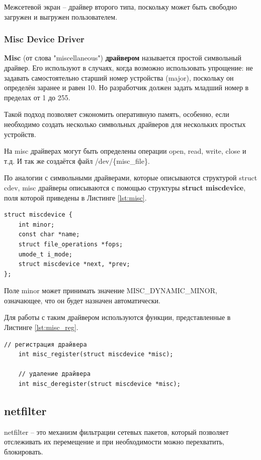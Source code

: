Межсетевой экран -- драйвер второго типа, поскольку может быть свободно загружен и выгружен пользователем. \newline

\subsubsection{Misc Device Driver}
\textbf{Misc} (от слова "miscellaneous") \textbf{драйвером} называется простой символьный драйвер. Его используют в случаях, когда возможно использовать упрощение: не задавать самостоятельно старший номер устройства (major), поскольку он определён заранее и равен 10. Но разработчик должен задать младший номер в пределах от 1 до 255. \cite{2nd,misc}

Такой подход позволяет сэкономить оперативную память, особенно, если необходимо создать несколько символьных драйверов для нескольких простых устройств.

На misc драйверах могут быть определены операции open, read, write, close и т.д. И так же создаётся файл /dev/\{misc\_file\}.

По аналогии с символьными драйверами, которые описываются структурой struct cdev, misc драйверы описываются с помощью структуры \textbf{struct miscdevice}, поля которой приведены в Листинге \ref{lst:misc}.
\begin{lstlisting}[caption = {struct miscdevice}, label=lst:misc]
struct miscdevice {
	int minor;
	const char *name;
	struct file_operations *fops;
	umode_t i_mode;
	struct miscdevice *next, *prev;
};
\end{lstlisting}

Поле minor может принимать значение MISC\_DYNAMIC\_MINOR, означающее, что он будет назначен автоматически. \cite{3d}

Для работы с таким драйвером используются функции, представленные в Листинге \ref{lst:misc_reg}.
\begin{lstlisting}[caption = {Функции для регистрации и удаления misc драйвера}, label=lst:misc_reg]
	// регистрация драйвера
	int misc_register(struct miscdevice *misc);
	
	// удаление драйвера
	int misc_deregister(struct miscdevice *misc);
\end{lstlisting}

\subsection{netfilter}
netfilter -- это механизм фильтрации сетевых пакетов, который позволяет отслеживать их перемещение и при необходимости можно перехватить, блокировать. \cite{hook} \newline


